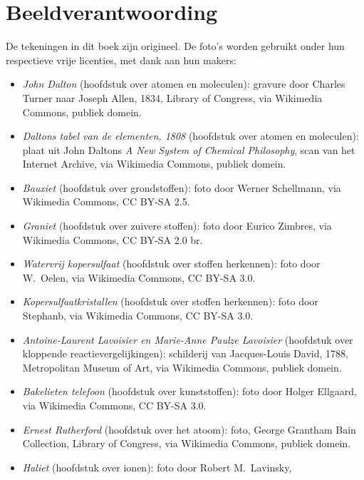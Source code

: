 \chapter*{Beeldverantwoording}

De tekeningen in dit boek zijn origineel. De foto's worden gebruikt onder
hun respectieve vrije licenties, met dank aan hun makers:

\begin{itemize}
  \item \emph{John Dalton} (hoofdstuk over atomen en moleculen): gravure
        door Charles Turner naar Joseph Allen, 1834, Library of Congress,
        via Wikimedia Commons, publiek domein.
  \item \emph{Daltons tabel van de elementen, 1808} (hoofdstuk over atomen
        en moleculen): plaat uit John Daltons \emph{A New System of
        Chemical Philosophy}, scan van het Internet Archive, via Wikimedia
        Commons, publiek domein.
  \item \emph{Bauxiet} (hoofdstuk over grondstoffen): foto door Werner
        Schellmann, via Wikimedia Commons, CC BY-SA 2.5.
  \item \emph{Graniet} (hoofdstuk over zuivere stoffen): foto door Eurico
        Zimbres, via Wikimedia Commons, CC BY-SA 2.0 br.
  \item \emph{Watervrij kopersulfaat} (hoofdstuk over stoffen herkennen):
        foto door W.~Oelen, via Wikimedia Commons, CC BY-SA 3.0.
  \item \emph{Kopersulfaatkristallen} (hoofdstuk over stoffen herkennen):
        foto door Stephanb, via Wikimedia Commons, CC BY-SA 3.0.
  \item \emph{Antoine-Laurent Lavoisier en Marie-Anne Paulze Lavoisier}
        (hoofdstuk over kloppende reactievergelijkingen): schilderij van
        Jacques-Louis David, 1788, Metropolitan Museum of Art, via
        Wikimedia Commons, publiek domein.
  \item \emph{Bakelieten telefoon} (hoofdstuk over kunststoffen): foto
        door Holger Ellgaard, via Wikimedia Commons, CC BY-SA 3.0.
  \item \emph{Ernest Rutherford} (hoofdstuk over het atoom): foto, George
        Grantham Bain Collection, Library of Congress, via Wikimedia
        Commons, publiek domein.
  \item \emph{Haliet} (hoofdstuk over ionen): foto door Robert M.~Lavinsky,

\end{itemize}
